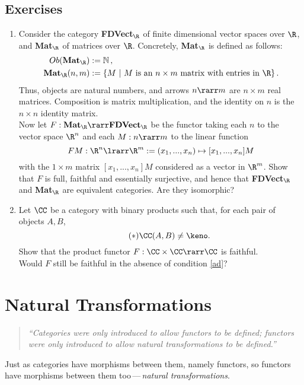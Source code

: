 \documentclass{svmult}
\begin{document}
\subsection{Exercises}\label{ex:Funct}
\begin{enumerate}\renewcommand{\theenumi}{\textbf{\arabic{enumi}}}
  \item Consider the category \textbf{FDVect}$_\R$ of finite dimensional vector spaces over $\R$, and \textbf{Mat}$_\R$ of matrices
        over $\R$. Concretely, \textbf{Mat}$_\R$ is defined as follows:
        \begin{align*}
            Ob(\mathbf{Mat}_\R) &:=\mathbb{N}\,,\\
            \mathbf{Mat}_\R(n,m)&:=\{M\ |\ M\text{ is an $n\times m$ matrix with entries in $\R$}\}\,.
        \end{align*}
        Thus, objects are natural numbers, and arrows $n\rarr m$ are $n\times m$ real matrices.
        Composition is matrix multiplication, and the identity on $n$ is the $n \times n$ identity matrix.
        \\
        Now let $F:\mathbf{Mat}_\R\rarr\mathbf{FDVect}_\R$ be the functor taking each $n$ to the vector space $\R^n$ and each $M:n\rarr m$ to the linear
        function
        \[ FM:\R^n\lrarr\R^m:=(x_1,...,x_n)\mapsto [x_1,...,x_n]M \]
        with the $1\times m$ matrix $[x_1,...,x_n]M$ considered as a vector in $\R^{m}$. Show that $F$ is full, faithful and essentially surjective,
        and hence  that \textbf{FDVect}$_\R$ and \textbf{Mat}$_\R$ are equivalent categories. Are they isomorphic?
  \item Let $\CC$ be a category with binary products such that, for each pair of objects $A,B$,
    \begin{equation}\label{ad}\tag{$*$}
    \CC(A,B)\neq\keno.
    \end{equation}
    Show that the product functor $F:\CC\times\CC\rarr\CC$ is faithful.
    \\ Would $F$ still be faithful in the absence of condition \eqref{ad}?
\end{enumerate}

\section{Natural Transformations}
\begin{quote}\it
``Categories were only introduced to allow functors to be defined;  functors were only introduced to allow natural transformations to be defined.''
\end{quote}
Just as categories have morphisms between them, namely functors, so functors have morphisms between them too\,---\,\emph{natural transformations}.
\end{document}
